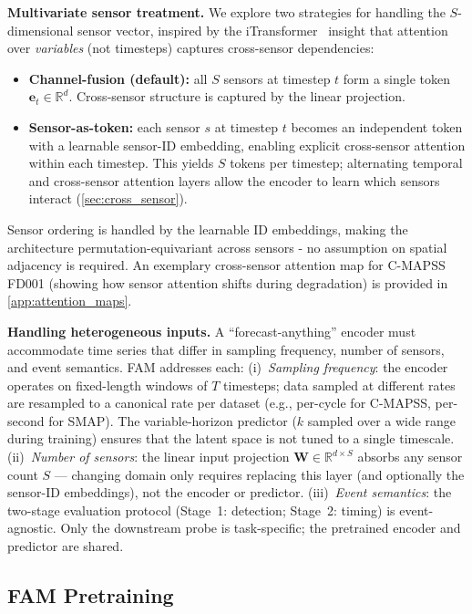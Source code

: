 \documentclass{article}
\newcommand{\R}{\mathbb{R}}
\newcommand{\W}{\mathbf{W}}
\begin{document}
\textbf{Multivariate sensor treatment.} We explore two strategies for handling the $S$-dimensional sensor vector, inspired by the iTransformer~\citep{liu2024itransformer} insight that attention over \emph{variables} (not timesteps) captures cross-sensor dependencies:
\begin{itemize}[nosep]
  \item \textbf{Channel-fusion (default):} all $S$ sensors at timestep $t$ form a single token $\mathbf{e}_t \in \R^d$. Cross-sensor structure is captured by the linear projection.
  \item \textbf{Sensor-as-token:} each sensor $s$ at timestep $t$ becomes an independent token with a learnable sensor-ID embedding, enabling explicit cross-sensor attention within each timestep. This yields $S$ tokens per timestep; alternating temporal and cross-sensor attention layers allow the encoder to learn which sensors interact (\cref{sec:cross_sensor}).
\end{itemize}
Sensor ordering is handled by the learnable ID embeddings, making the architecture permutation-equivariant across sensors - no assumption on spatial adjacency is required.
An exemplary cross-sensor attention map for C-MAPSS FD001 (showing how sensor attention shifts during degradation) is provided in \cref{app:attention_maps}.

\textbf{Handling heterogeneous inputs.} A ``forecast-anything'' encoder must accommodate time series that differ in sampling frequency, number of sensors, and event semantics. FAM addresses each: (i)~\emph{Sampling frequency}: the encoder operates on fixed-length windows of $T$ timesteps; data sampled at different rates are resampled to a canonical rate per dataset (e.g., per-cycle for C-MAPSS, per-second for SMAP). The variable-horizon predictor ($k$ sampled over a wide range during training) ensures that the latent space is not tuned to a single timescale. (ii)~\emph{Number of sensors}: the linear input projection $\W \in \R^{d \times S}$ absorbs any sensor count $S$ --- changing domain only requires replacing this layer (and optionally the sensor-ID embeddings), not the encoder or predictor. (iii)~\emph{Event semantics}: the two-stage evaluation protocol (Stage~1: detection; Stage~2: timing) is event-agnostic. Only the downstream probe is task-specific; the pretrained encoder and predictor are shared.

\subsection{FAM Pretraining}
\label{sec:jepa}
\end{document}
